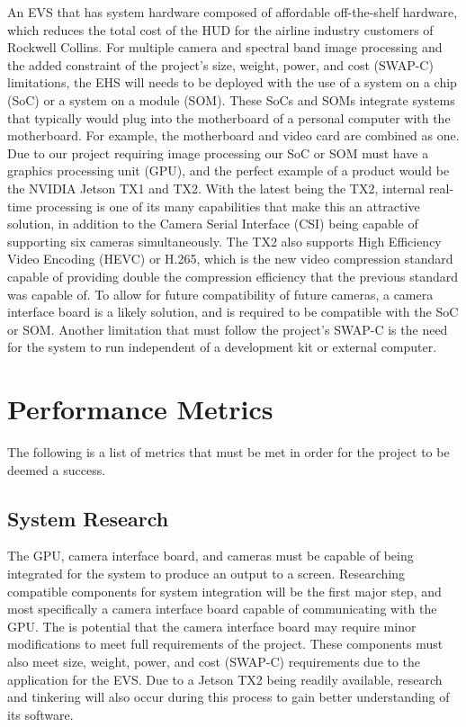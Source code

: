 \documentclass[letterpaper,10pt,serif,draftclsnofoot,onecolumn,compsoc,titlepage]{IEEEtran}
\begin{document}
An EVS that has system hardware composed of affordable off-the-shelf hardware, which 
reduces the total cost of the HUD for the airline industry customers of Rockwell 
Collins. For multiple camera and spectral band image processing and the added 
constraint of the project’s size, weight, power, and cost (SWAP-C) limitations, the 
EHS will needs to be deployed with the use of a system on a chip (SoC) or a system on 
a module (SOM). These SoCs and SOMs integrate systems that typically would plug into 
the motherboard of a personal computer with the motherboard. For example, the 
motherboard and video card are combined as one. Due to our project requiring image 
processing our SoC or SOM must have a graphics processing unit (GPU), and the perfect 
example of a product would be the NVIDIA Jetson TX1 and TX2. With the latest being the 
TX2, internal real-time processing is one of its many capabilities that make this an 
attractive solution, in addition to the Camera Serial Interface (CSI) being capable of 
supporting six cameras simultaneously. The TX2 also supports High Efficiency Video 
Encoding (HEVC) or H.265, which is the new video compression standard capable of 
providing double the compression efficiency that the previous standard was capable 
of. To allow for future compatibility of future cameras, a camera interface board is 
a likely solution, and is required to be compatible with the SoC or SOM. Another 
limitation that must follow the project’s SWAP-C is the need for the system to run 
independent of a development kit or external computer.\\

\section{Performance Metrics}

The following is a list of metrics that must be met in order for the project to be 
deemed a success.\\

\subsection{System Research}

The GPU, camera interface board, and cameras must be capable of being integrated for 
the system to produce an output to a screen. Researching compatible components for 
system integration will be the first major step, and most specifically a camera 
interface board capable of communicating with the GPU. The is potential that the 
camera interface board may require minor modifications to meet full requirements of 
the project. These components must also meet size, weight, power, and cost (SWAP-C) 
requirements due to the application for the EVS. Due to a Jetson TX2 being readily 
available, research and tinkering will also occur during this process to gain better 
understanding of its software.\\
\end{document}
